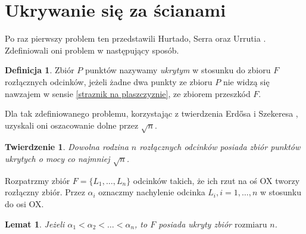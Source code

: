\documentclass[brudnopis]{xmgr}
\newtheorem{Twierdzenie}{Twierdzenie}
\newtheorem{Lemat}{Lemat}
\theoremstyle{definition}
\newtheorem{Definicja}{Definicja}
\begin{document}
\section{Ukrywanie się za ścianami}
Po raz pierwszy problem ten przedstawili Hurtado, Serra oraz Urrutia \cite{sciany}. Zdefiniowali oni problem w następujący sposób.

\begin{Definicja}\label{ukrywanie definicja}
 Zbiór $P$ punktów nazywamy \emph{ukrytym} w stosunku do zbioru $F$ rozłącznych odcinków, jeżeli żadne dwa punkty ze zbioru $P$ nie widzą się nawzajem w sensie \ref{straznik na plaszczyznie}, ze zbiorem przeszkód $F$.
\end{Definicja}

Dla tak zdefiniowanego problemu, korzystając z twierdzenia Erd{\H o}sa i Szekeresa \cite{erdosszekeres}, uzyskali oni oszacowanie dolne przez $\sqrt{n}$.

\begin{Twierdzenie}\label{moc zbioru ukrytego tw} \cite{illumination}
  Dowolna rodzina $n$ rozłącznych odcinków posiada zbiór punktów ukrytych o mocy co najmniej $\sqrt{n}$.
\end{Twierdzenie}

Rozpatrzmy zbiór $F = \{L_1,\ldots,L_n\}$ odcinków takich, że ich rzut na oś OX tworzy rozłączny zbiór. Przez $\alpha_i$ oznaczmy nachylenie odcinka $L_i, i = 1,\ldots,n$ w stosunku do osi OX.
\begin{Lemat}\label{zbior ukryty} \cite{illumination}
  Jeżeli $\alpha_1 < \alpha_2 < \ldots < \alpha_n$, to $F$ posiada ukryty zbiór $\mbox{rozmiaru $n$}$.
\end{Lemat}
\end{document}

